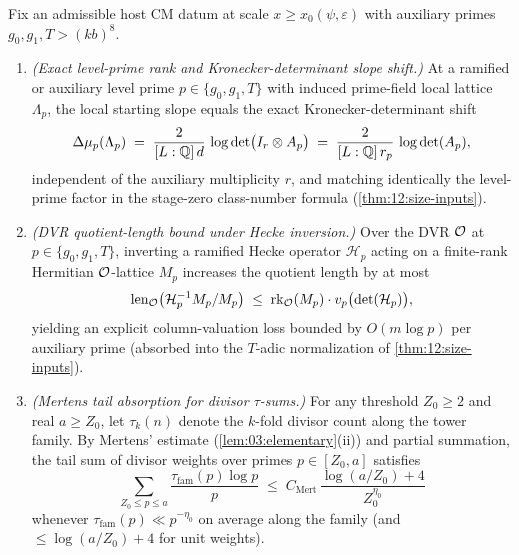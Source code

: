\begin{proposition}
\label{prop:10:level-prime}
Fix an admissible host CM datum at scale $x \ge x_0(\psi, \varepsilon)$ with auxiliary primes $g_0, g_1, T > (k b)^8$.
\begin{enumerate}[label=\textup{(\roman*)}]
\item \emph{(Exact level-prime rank and Kronecker-determinant slope shift.)} At a ramified or auxiliary level prime $p \in \{g_0, g_1, T\}$ with induced prime-field local lattice $\Lambda_p$, the local starting slope equals the exact Kronecker-determinant shift
  \begin{equation}
  \label{eq:10:kronecker-shift}
    \Delta\mu_p(\Lambda_p) \;=\; \frac{2}{[L:\mathbb{Q}]\, d}\,\log\det\bigl(I_r \otimes A_p\bigr)
    \;=\; \frac{2}{[L:\mathbb{Q}]\, r_p}\,\log\det(A_p),
  \end{equation}
  independent of the auxiliary multiplicity $r$, and matching identically the level-prime factor in the stage-zero class-number formula (\cref{thm:12:size-inputs}).
\item \emph{(DVR quotient-length bound under Hecke inversion.)} Over the DVR $\mathcal{O}$ at $p \in \{g_0, g_1, T\}$, inverting a ramified Hecke operator $\mathcal{H}_p$ acting on a finite-rank Hermitian $\mathcal{O}$-lattice $M_p$ increases the quotient length by at most
  \[
    \operatorname{len}_{\mathcal{O}}\bigl(\mathcal{H}_p^{-1} M_p / M_p\bigr) \;\le\; \operatorname{rk}_{\mathcal{O}}(M_p)\cdot v_p\bigl(\det(\mathcal{H}_p)\bigr),
  \]
  yielding an explicit column-valuation loss bounded by $O(m \log p)$ per auxiliary prime (absorbed into the $T$-adic normalization of \cref{thm:12:size-inputs}).
\item \emph{(Mertens tail absorption for divisor $\tau$-sums.)} For any threshold $Z_0 \ge 2$ and real $a \ge Z_0$, let $\tau_k(n)$ denote the $k$-fold divisor count along the tower family. By Mertens' estimate (\cref{lem:03:elementary}(ii)) and partial summation, the tail sum of divisor weights over primes $p \in [Z_0, a]$ satisfies
  \begin{equation}
  \label{eq:10:mertens-tau}
    \sum_{Z_0 \le p \le a} \frac{\tau_{\mathrm{fam}}(p)\log p}{p}
    \;\le\; C_{\mathrm{Mert}}\,\frac{\log(a / Z_0) + 4}{Z_0^{\eta_0}}
  \end{equation}
  whenever $\tau_{\mathrm{fam}}(p) \ll p^{-\eta_0}$ on average along the family (and $\le \log(a/Z_0) + 4$ for unit weights).
\end{enumerate}
\end{proposition}

